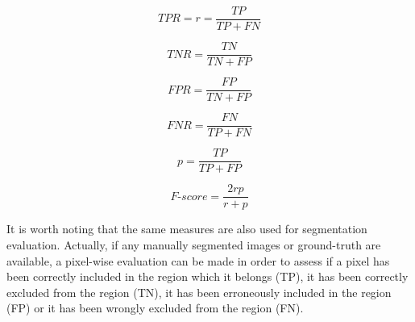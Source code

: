\documentclass[final,a4paper,12pt,english]{UnicaPhdThesis3}
\begin{document}
\begin{equation}\label{TPR}
TPR = r = \frac{TP}{TP + FN}    
\end{equation}

\begin{equation}\label{TNR}
TNR = \frac{TN}{TN + FP}    
\end{equation}

\begin{equation}\label{FPR}
FPR= \frac{FP}{TN + FP}    
\end{equation}

\begin{equation}\label{FNR}
FNR= \frac{FN}{TP + FN}    
\end{equation}

\begin{equation}\label{precision}
p = \frac{TP}{TP + FP}    
\end{equation}

\begin{equation}\label{Fmeasure}
F\mbox{-}score = \frac{2rp}{r + p}    
\end{equation}

It is worth noting that the same measures are also used for segmentation evaluation. Actually, if any manually segmented images or ground-truth are available, a pixel-wise evaluation can be made in order to assess if a pixel has been correctly included in the region which it belongs (TP), it has been correctly excluded from the region (TN), it has been erroneously included in the region (FP) or it has been wrongly excluded from the region (FN).
\end{document}
